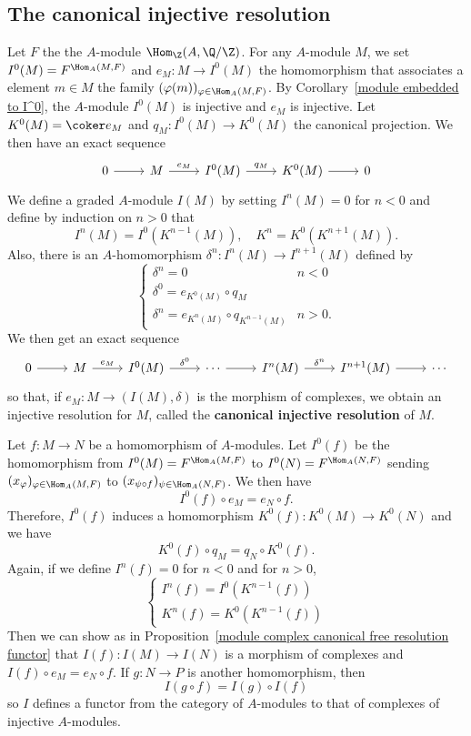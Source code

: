 \subsection{The canonical injective resolution}
Let $F$ the the $A$-module $\Hom_{\Z}(A,\Q/\Z)$. For any $A$-module $M$, we set $I^0(M)=F^{\Hom_A(M,F)}$ and $e_M:M\to I^0(M)$ the homomorphism that associates a element $m\in M$ the family $(\varphi(m))_{\varphi\in\Hom_A(M,F)}$. By Corollary~\ref{module embedded to I^0}, the $A$-module $I^0(M)$ is injective and $e_M$ is injective. Let $K^0(M)=\coker e_M$ and $q_M:I^0(M)\to K^0(M)$ the canonical projection. We then have an exact sequence
\[\begin{tikzcd}
0\ar[r]&M\ar[r,"e_M"]&I^0(M)\ar[r,"q_M"]&K^0(M)\ar[r]&0
\end{tikzcd}\] 
We define a graded $A$-module $I(M)$ by setting $I^n(M)=0$ for $n<0$ and define by induction on $n>0$ that
\[I^n(M)=I^0(K^{n-1}(M)),\quad K^n=K^0(K^{n+1}(M)).\]
Also, there is an $A$-homomorphism $\delta^n:I^n(M)\to I^{n+1}(M)$ defined by
\[\begin{cases}
\delta^n=0&n<0\\
\delta^0=e_{K^0(M)}\circ q_M&\\
\delta^n=e_{K^n(M)}\circ q_{K^{n-1}(M)}&n>0.
\end{cases}\]
We then get an exact sequence
\[\begin{tikzcd}
0\ar[r]&M\ar[r,"e_M"]&I^0(M)\ar[r,"\delta^0"]&\cdots\ar[r]&I^n(M)\ar[r,"\delta^n"]&I^{n+1}(M)\ar[r]&\cdots
\end{tikzcd}\]
so that, if $e_M:M\to(I(M),\delta)$ is the morphism of complexes, we obtain an injective resolution for $M$, called the \textbf{canonical injective resolution} of $M$.\par
Let $f:M\to N$ be a homomorphism of $A$-modules. Let $I^0(f)$ be the homomorphism from $I^0(M)=F^{\Hom_A(M,F)}$ to $I^0(N)=F^{\Hom_A(N,F)}$ sending $(x_\varphi)_{\varphi\in\Hom_A(M,F)}$ to $(x_{\psi\circ f})_{\psi\in\Hom_A(N,F)}$. We then have
\[I^0(f)\circ e_M=e_N\circ f.\]
Therefore, $I^0(f)$ induces a homomorphism $K^0(f):K^0(M)\to K^0(N)$ and we have
\[K^0(f)\circ q_M=q_N\circ K^0(f).\]
Again, if we define $I^n(f)=0$ for $n<0$ and for $n>0$,
\[\begin{cases}
I^n(f)=I^0(K^{n-1}(f))\\
K^n(f)=K^0(K^{n-1}(f))
\end{cases}\]
Then we can show as in Proposition~\ref{module complex canonical free resolution functor} that $I(f):I(M)\to I(N)$ is a morphism of complexes and $I(f)\circ e_M=e_N\circ f$. If $g:N\to P$ is another homomorphism, then
\[I(g\circ f)=I(g)\circ I(f)\]
so $I$ defines a functor from the category of $A$-modules to that of complexes of injective $A$-modules.
